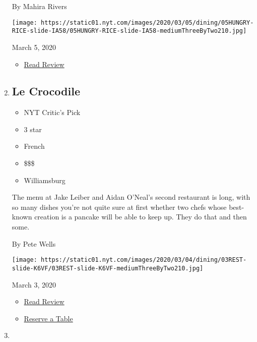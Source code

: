 \begin{enumerate}
  By Mahira Rivers

  \texttt{[image: https://static01.nyt.com/images/2020/03/05/dining/05HUNGRY-RICE-slide-IA58/05HUNGRY-RICE-slide-IA58-mediumThreeByTwo210.jpg]}

  March 5, 2020

  \begin{itemize}
  \tightlist
  \item
    \href{https://www.nytimes.com/2020/03/05/dining/rice-and-miso-review-onigiri.html?rref=collection\%2Fcollection\%2Frestaurant-guide}{Read
    Review}
  \end{itemize}
\item
  \href{https://www.nytimes.com/2020/03/03/dining/le-crocodile-review-pete-wells.html}{}

  \hypertarget{le-crocodile}{%
  \subsection{Le Crocodile}\label{le-crocodile}}

  \begin{itemize}
  \tightlist
  \item
    NYT Critic's Pick
  \item
     3 star
  \item
    French
  \item
    \$\$\$
  \item
    Williamsburg
  \end{itemize}

  The menu at Jake Leiber and Aidan O'Neal's second restaurant is long,
  with so many dishes you're not quite sure at first whether two chefs
  whose best-known creation is a pancake will be able to keep up. They
  do that and then some.

  By Pete Wells

  \texttt{[image: https://static01.nyt.com/images/2020/03/04/dining/03REST-slide-K6VF/03REST-slide-K6VF-mediumThreeByTwo210.jpg]}

  March 3, 2020

  \begin{itemize}
  \tightlist
  \item
    \href{https://www.nytimes.com/2020/03/03/dining/le-crocodile-review-pete-wells.html?rref=collection\%2Fcollection\%2Frestaurant-guide}{Read
    Review}
  \item
    \href{https://resy.com/cities/ny/le-crocodile?utm_source=nyt\&utm_medium=restoprofile\&utm_campaign=affiliates\&aff_id=c1fe784}{Reserve
    a Table}
  \end{itemize}
\item
  \href{https://www.nytimes.com/2020/02/28/dining/hamido-seafood-astoria.html}{}


\end{enumerate}
